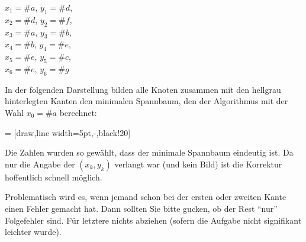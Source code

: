 \documentclass[12pt]{article}
\begin{document}
\begin{loesung}
  $x_1 = \#a$, $y_1 = \#d$, \\
  $x_2 = \#d$, $y_2 = \#f$, \\
  $x_3 = \#a$, $y_3 = \#b$, \\
  $x_4 = \#b$, $y_4 = \#e$, \\
  $x_5 = \#e$, $y_5 = \#c$, \\
  $x_6 = \#e$, $y_6 = \#g$

  In der folgenden Darstellung bilden alle Knoten zusammen mit den hellgrau hinterlegten Kanten den minimalen Spannbaum, den der Algorithmus mit der Wahl $x_0 = \#a$ berechnet:

   = [draw,line width=5pt,-,black!20]


  \begin{korrektur}
    Die Zahlen wurden so gewählt, dass der minimale Spannbaum
    eindeutig ist. Da nur die Angabe der $(x_k,y_k)$ verlangt war (und
    kein Bild) ist die Korrektur hoffentlich schnell möglich.

    Problematisch wird es, wenn jemand schon bei der ersten oder
    zweiten Kante einen Fehler gemacht hat. Dann sollten Sie bitte
    gucken, ob der Rest "`nur"' Folgefehler sind. Für letztere nichts
    abziehen (sofern die Aufgabe nicht signifikant leichter wurde).
  \end{korrektur}
\end{loesung}
\end{document}
